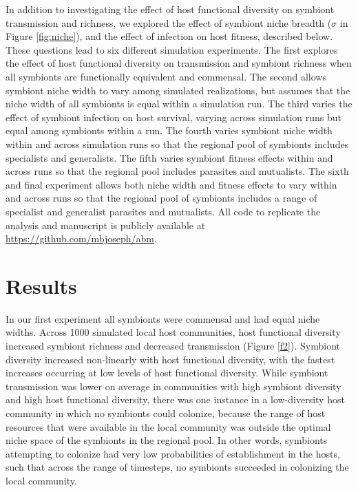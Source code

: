 In addition to investigating the effect of host functional diversity on symbiont transmission and richness, we explored the effect of symbiont niche breadth ($\sigma$ in Figure \ref{fig:niche}), and the effect of infection on host fitness, described below.
These questions lead to six different simulation experiments. %
The first explores the effect of host functional diversity on transmission and symbiont richness when all symbionts are functionally equivalent and commensal.
The second allows symbiont niche width to vary among simulated realizations, but assumes that the niche width of all symbionts is equal within a simulation run.
The third varies the effect of symbiont infection on host survival, varying across simulation runs but equal among symbionts within a run.
The fourth varies symbiont niche width within and across simulation runs so that the regional pool of symbionts includes specialists and generalists.
The fifth varies symbiont fitness effects within and across runs so that the regional pool includes parasites and mutualists.
The sixth and final experiment allows both niche width and fitness effects to vary within and across runs so that the regional pool of symbionts includes a range of specialist and generalist parasites and mutualists.
All code to replicate the analysis and manuscript is publicly available at \url{https://github.com/mbjoseph/abm}.

\section{Results}

In our first experiment all symbionts were commensal and had equal niche widths.
Across 1000 simulated local host communities, host functional diversity increased symbiont richness and decreased transmission (Figure \ref{f2}).
Symbiont diversity increased non-linearly with host functional diversity, with the fastest increases occurring at low levels of host functional diversity.
While symbiont transmission was lower on average in communities with high symbiont diversity and high host functional diversity, there was one instance in a low-diversity host community in which no symbionts could colonize, because the range of host resources that were available in the local community was outside the optimal niche space of the symbionts in the regional pool.
In other words, symbionts attempting to colonize had very low probabilities of establishment in the hosts, such that across the range of timesteps, no symbionts succeeded in colonizing the local community.

